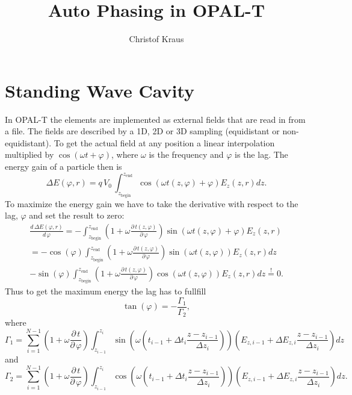 \documentclass[automark,a4paper,11pt,headsepline]{scrartcl}
\author{Christof Kraus}
\title{Auto Phasing in OPAL-T}
\begin{document}
\maketitle

\section{Standing Wave Cavity}
In OPAL-T the elements are implemented as external fields that are read in from a file. The fields are described by a 1D, 2D or 3D sampling (equidistant or non-equidistant). To get the actual field at any position a linear interpolation multiplied by $\cos(\omega t + \varphi)$, where $\omega$ is the frequency and $\varphi$ is the lag. The energy gain of a particle then is
\begin{equation}
\Delta E(\varphi,r) = q\,V_{0}\,\int_{z_\text{begin}}^{z_\text{end}} \cos(\omega t(z,\varphi) + \varphi) E_z(z, r) dz.
\end{equation}
To maximize the energy gain we have to take the derivative with respect to the lag, $\varphi$ and set the result to zero:
\begin{multline}
\frac{d\, \Delta E(\varphi,r)}{d\,\varphi} = -\int_{z_\text{begin}}^{z_\text{end}} (1 + \omega \frac{\partial\,t(z,\varphi)}{\partial\,\varphi}) \sin(\omega t(z,\varphi) + \varphi) E_z(z,r)\\
= -\cos(\varphi) \int_{z_\text{begin}}^{z_\text{end}} (1 + \omega \frac{\partial\,t(z,\varphi)}{\partial\,\varphi}) \sin(\omega t(z,\varphi)) E_z(z,r) dz \\
-\sin(\varphi) \int_{z_\text{begin}}^{z_\text{end}} (1 + \omega \frac{\partial\,t(z,\varphi)}{\partial\,\varphi}) \cos(\omega t(z,\varphi)) E_z(z,r) dz \stackrel{!}{=} 0.
\end{multline}
Thus to get the maximum energy the lag has to fullfill 
\begin{equation} \label{eqn:rulelag}
  \tan(\varphi) = -\frac{\Gamma_1}{\Gamma_2},
\end{equation}
where 
\begin{equation}
  \label{eqn:Gamma1}
  \Gamma_1 = \sum_{i=1}^{N-1} (1 + \omega \frac{\partial\,t}{\partial\,\varphi}) \int_{z_{i-1}}^{z_{i}} \sin\left(\omega (t_{i-1} + \Delta t_{i}\frac{z-z_{i-1}}{\Delta z_{i}})\right)\left(E_{z,i-1} + \Delta E_{z,i} \frac{z-z_{i-1}}{\Delta z_{i}}\right) dz
\end{equation}
and
\begin{equation}
  \label{eqn:Gamma2}
  \Gamma_2 = \sum_{i=1}^{N-1} (1 + \omega \frac{\partial\,t}{\partial\,\varphi}) \int_{z_{i-1}}^{z_{i}} \cos\left(\omega (t_{i-1} + \Delta t_{i}\frac{z-z_{i-1}}{\Delta z_{i}})\right)\left(E_{z,i-1} + \Delta E_{z,i} \frac{z-z_{i-1}}{\Delta z_{i}}\right) dz.
\end{equation}
\end{document}
